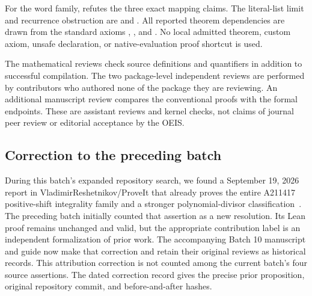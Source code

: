\documentclass[11pt]{article}
\begin{document}
For the word family, 
refutes the three exact mapping claims.  The literal-list limit and
recurrence obstruction are
 and
.
All reported theorem dependencies are drawn from the standard axioms
, , and .
No local admitted theorem, custom axiom, unsafe declaration, or
native-evaluation proof shortcut is used.

The mathematical reviews check source definitions and quantifiers in
addition to successful compilation.  The two package-level independent
reviews are performed by contributors who authored none of the package
they are reviewing.  An additional manuscript review compares the
conventional proofs with the formal endpoints.  These are assistant
reviews and kernel checks, not claims of journal peer review or
editorial acceptance by the OEIS.

\subsection*{Correction to the preceding batch}

During this batch's expanded repository search, we found a September
19, 2026 report in VladimirReshetnikov/ProveIt that already proves
the entire A211417 positive-shift integrality family and a stronger
polynomial-divisor classification~\cite{PriorA211417}.  The preceding
batch initially counted that assertion as a new resolution.  Its Lean
proof remains unchanged and valid, but the appropriate contribution
label is an independent formalization of prior work.  The accompanying
Batch 10 manuscript and guide now make that correction and retain
their original reviews as historical records.  This attribution
correction is not counted among the current batch's four source
assertions.  The dated correction record gives the precise prior
proposition, original repository commit, and before-and-after hashes.
\end{document}

